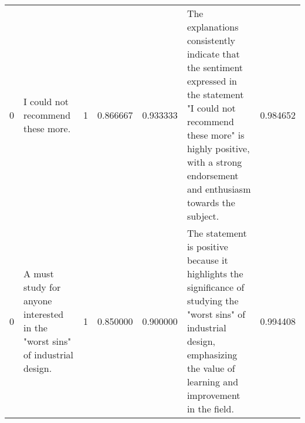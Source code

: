 \begin{tabular}{rlrrrlr}
0 & I could not recommend these more. & 1 & 0.866667 & 0.933333 & The explanations consistently indicate that the sentiment expressed in the statement "I could not recommend these more" is highly positive, with a strong endorsement and enthusiasm towards the subject. & 0.984652 \\
0 & A must study for anyone interested in the "worst sins" of industrial design. & 1 & 0.850000 & 0.900000 & The statement is positive because it highlights the significance of studying the "worst sins" of industrial design, emphasizing the value of learning and improvement in the field. & 0.994408 \\
\bottomrule
\end{tabular}
